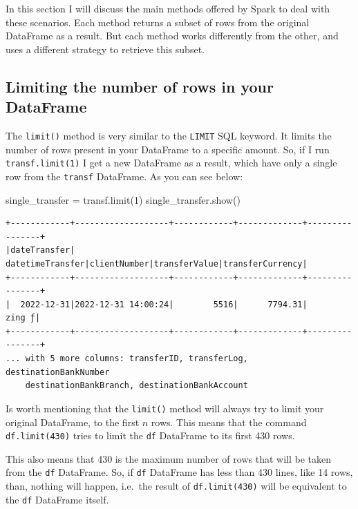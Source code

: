 \documentclass[
  11pt,
  letterpaper,
  DIV=11,
  numbers=noendperiod]{scrreprt}
\newenvironment{Shaded}{\begin{snugshade}}{\end{snugshade}}
\newcommand{\DecValTok}[1]{\textcolor[rgb]{0.68,0.00,0.00}{#1}}
\newcommand{\NormalTok}[1]{\textcolor[rgb]{0.00,0.23,0.31}{#1}}
\newcommand{\OperatorTok}[1]{\textcolor[rgb]{0.37,0.37,0.37}{#1}}
\begin{document}
In this section I will discuss the main methods offered by Spark to deal
with these scenarios. Each method returns a subset of rows from the
original DataFrame as a result. But each method works differently from
the other, and uses a different strategy to retrieve this subset.

\hypertarget{limiting-the-number-of-rows-in-your-dataframe}{%
\subsection{Limiting the number of rows in your
DataFrame}\label{limiting-the-number-of-rows-in-your-dataframe}}

The \texttt{limit()} method is very similar to the \texttt{LIMIT} SQL
keyword. It limits the number of rows present in your DataFrame to a
specific amount. So, if I run \texttt{transf.limit(1)} I get a new
DataFrame as a result, which have only a single row from the
\texttt{transf} DataFrame. As you can see below:

\begin{Shaded}
\begin{Highlighting}[]
\NormalTok{single\_transfer }\OperatorTok{=}\NormalTok{ transf.limit(}\DecValTok{1}\NormalTok{)}
\NormalTok{single\_transfer.show()}
\end{Highlighting}
\end{Shaded}

\begin{verbatim}
+------------+-------------------+------------+-------------+----------------+
|dateTransfer|   datetimeTransfer|clientNumber|transferValue|transferCurrency|
+------------+-------------------+------------+-------------+----------------+
|  2022-12-31|2022-12-31 14:00:24|        5516|      7794.31|          zing ƒ|
+------------+-------------------+------------+-------------+----------------+
... with 5 more columns: transferID, transferLog, destinationBankNumber
    destinationBankBranch, destinationBankAccount
\end{verbatim}

Is worth mentioning that the \texttt{limit()} method will always try to
limit your original DataFrame, to the first \(n\) rows. This means that
the command \texttt{df.limit(430)} tries to limit the \texttt{df}
DataFrame to its first 430 rows.

This also means that 430 is the maximum number of rows that will be
taken from the \texttt{df} DataFrame. So, if \texttt{df} DataFrame has
less than 430 lines, like 14 rows, than, nothing will happen, i.e.~the
result of \texttt{df.limit(430)} will be equivalent to the \texttt{df}
DataFrame itself.
\end{document}
